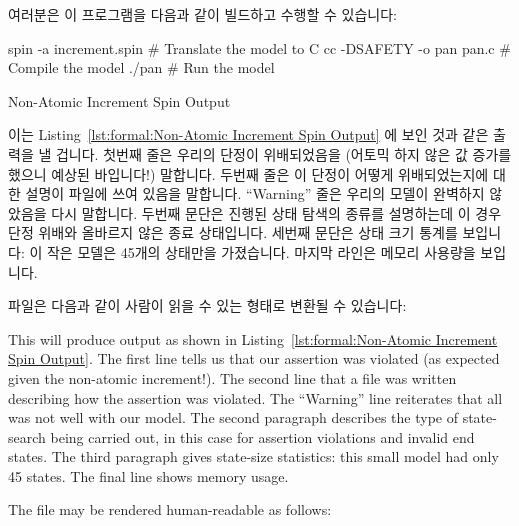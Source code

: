 \fi

여러분은 이 프로그램을 다음과 같이 빌드하고 수행할 수 있습니다:

\iffalse

You can build and run this program as follows:

\fi

\begin{VerbatimU}
spin -a increment.spin      # Translate the model to C
cc -DSAFETY -o pan pan.c    # Compile the model
./pan                       # Run the model
\end{VerbatimU}

\begin{listing}[tbp]
\vspace*{-9pt}
\caption{Non-Atomic Increment Spin Output}
\label{lst:formal:Non-Atomic Increment Spin Output}
\end{listing}

이는
Listing~\ref{lst:formal:Non-Atomic Increment Spin Output} 에 보인 것과 같은
출력을 낼 겁니다.
첫번째 줄은 우리의 단정이 위배되었음을 (어토믹 하지 않은 값 증가를 했으니
예상된 바입니다!) 말합니다.
두번째 줄은 이 단정이 어떻게 위배되었는지에 대한 설명이  파일에 쓰여
있음을 말합니다.
``Warning'' 줄은 우리의 모델이 완벽하지 않았음을 다시 말합니다.
두번째 문단은 진행된 상태 탐색의 종류를 설명하는데 이 경우 단정 위배와 올바르지
않은 종료 상태입니다.
세번째 문단은 상태 크기 통계를 보입니다: 이 작은 모델은 45개의 상태만을
가졌습니다.
마지막 라인은 메모리 사용량을 보입니다.

 파일은 다음과 같이 사람이 읽을 수 있는 형태로 변환될 수 있습니다:

\iffalse

This will produce output as shown in
Listing~\ref{lst:formal:Non-Atomic Increment Spin Output}.
The first line tells us that our assertion was violated (as expected
given the non-atomic increment!).
The second line that a  file was written describing how the
assertion was violated.
The ``Warning'' line reiterates that all was not well with our model.
The second paragraph describes the type of state-search being carried out,
in this case for assertion violations and invalid end states.
The third paragraph gives state-size statistics: this small model had only
45 states.
The final line shows memory usage.

The  file may be rendered human-readable as follows:

